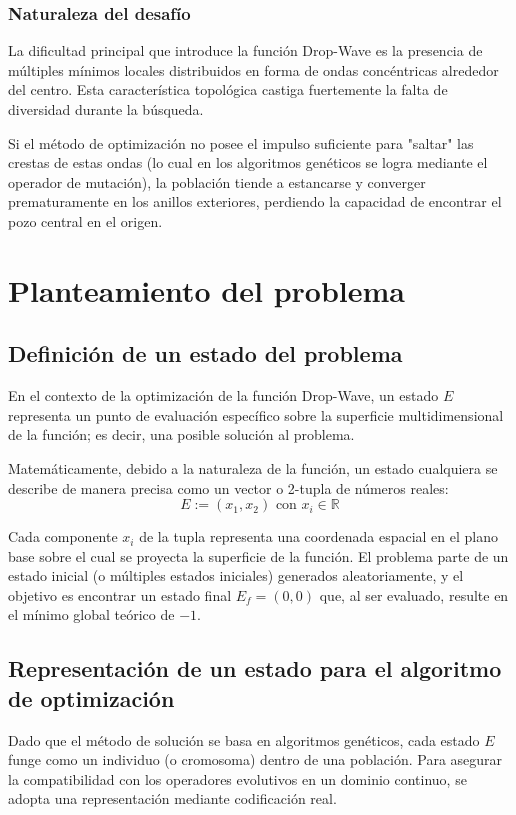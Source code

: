 \subsubsection{Naturaleza del desafío}
La dificultad principal que introduce la función Drop-Wave es la presencia de múltiples mínimos locales distribuidos en forma de ondas concéntricas alrededor del centro.
Esta característica topológica castiga fuertemente la falta de diversidad durante la búsqueda.

Si el método de optimización no posee el impulso suficiente para "saltar" las crestas de estas ondas (lo cual en los algoritmos genéticos se
logra mediante el operador de mutación), la población tiende a estancarse y converger prematuramente en los anillos exteriores, perdiendo la
capacidad de encontrar el pozo central en el origen.

\clearpage
\section{Planteamiento del problema}

\subsection{Definición de un estado del problema}
En el contexto de la optimización de la función Drop-Wave, un estado $E$ representa un punto de evaluación específico sobre la superficie multidimensional de
la función; es decir, una posible solución al problema.

Matemáticamente, debido a la naturaleza de la función, un estado cualquiera se describe de manera precisa como un vector o 2-tupla de números reales:
$$E := (x_{1}, x_{2}) \text{ con } x_{i} \in \mathbb{R}$$

Cada componente $x_{i}$ de la tupla representa una coordenada espacial en el plano base sobre el cual se proyecta la superficie de la función. El problema parte
de un estado inicial (o múltiples estados iniciales) generados aleatoriamente, y el objetivo es encontrar un estado final $E_{f} = (0, 0)$ que, al ser evaluado,
resulte en el mínimo global teórico de $-1$.

\subsection{Representación de un estado para el algoritmo de optimización}
Dado que el método de solución se basa en algoritmos genéticos, cada estado $E$ funge como un individuo (o cromosoma) dentro de una población. Para asegurar la
compatibilidad con los operadores evolutivos en un dominio continuo, se adopta una representación mediante codificación real.

